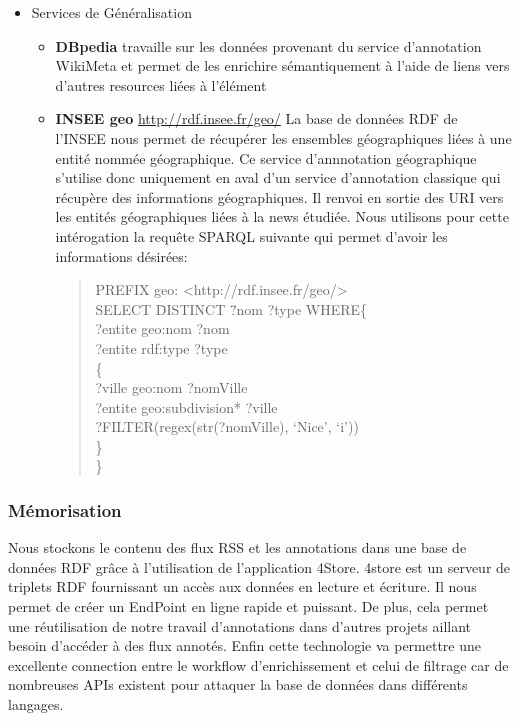 \documentclass[]{easychair}
\newcommand{\comment}[4]{\par\noindent\hspace*{-0.5cm}{\parbox{\columnwidth}{\textbf{\color{#1}//#2[#3]:#4}}}\par}
\newcommand{\mi}[1]{\comment{blue}{}{#1}{MI}}
\begin{document}
\begin{itemize}
\item Services de Généralisation
\begin{itemize}
\item \textbf{DBpedia} travaille sur les données provenant du service d'annotation WikiMeta et permet de les enrichire sémantiquement à l'aide de liens vers d'autres resources liées à l'élément
\item \textbf{INSEE geo} \url{http://rdf.insee.fr/geo/} La base de données RDF de l'INSEE nous permet de récupérer les ensembles géographiques liées à une entité nommée géographique. Ce service d'annnotation géographique s'utilise donc uniquement en aval d'un service d'annotation classique qui récupère des informations géographiques. Il renvoi en sortie des URI vers les entités géographiques liées à la news étudiée. Nous utilisons pour cette intérogation la requête SPARQL suivante qui permet d'avoir les informations désirées:
\begin{quote}
\begin{tabbing}
PREFIX geo: <http://rdf.insee.fr/geo/>\\
SELECT \= DISTINCT \= ?nom ?type WHERE\{\\
	\> ?entite geo:nom ?nom\\
	\> ?entite rdf:type ?type\\
	\> \{ \\
		\> \> ?ville geo:nom ?nomVille\\
		\> \> ?entite geo:subdivision* ?ville\\
		\> \> ?FILTER(regex(str(?nomVille), ‘Nice’, ‘i’))\\
	\>\}\\
\}
\end{tabbing}
\end{quote}
\end{itemize}
\end{itemize}


\subsubsection{Mémorisation}
\mi{je ne sens pas cette partie.. à voir}
Nous stockons le contenu des flux RSS et les annotations dans une base de données RDF grâce à l'utilisation de l'application 4Store. 4store est un serveur de triplets RDF fournissant un accès aux données en lecture et écriture. Il nous permet de créer un EndPoint en ligne rapide et puissant. De plus, cela permet une réutilisation de notre travail d'annotations dans d'autres projets aillant besoin d'accéder à des flux annotés. Enfin cette technologie va permettre une excellente connection entre le workflow d'enrichissement et celui de filtrage car de nombreuses APIs existent pour attaquer la base de données dans différents langages.
\end{document}
